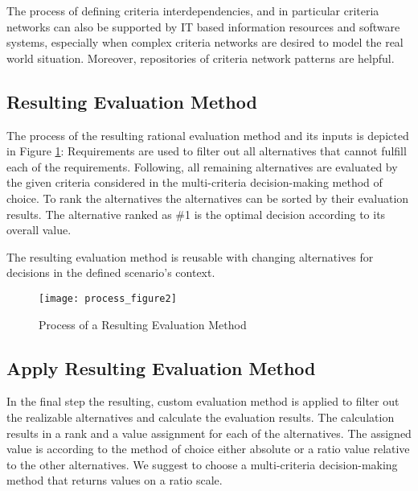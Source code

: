 \documentclass[journal,final,a4paper,twoside]{IEEEtran}
\begin{document}
The process of defining criteria interdependencies, and in particular criteria networks can also be supported by IT based information resources and software systems, especially when complex criteria networks are desired to model the real world situation. Moreover, repositories of criteria network patterns are helpful.

\subsection{Resulting Evaluation Method}
The process of the resulting rational evaluation method and its inputs is depicted in Figure \ref{fig2}: Requirements are used to filter out all alternatives that cannot fulfill each of the requirements. Following, all remaining alternatives are evaluated by the given criteria considered in the multi-criteria decision-making method of choice. To rank the alternatives the alternatives can be sorted by their evaluation results. The alternative ranked as \#1 is the optimal decision according to its overall value. 

The resulting evaluation method is reusable with changing alternatives for decisions in the defined scenario's context.

\begin{figure}[!t]
\centering
\texttt{[image: process\_figure2]}
\caption{Process of a Resulting Evaluation Method }
\label{fig2}
\end{figure}

\subsection{Apply Resulting Evaluation Method}
In the final step the resulting, custom evaluation method is applied to filter out the realizable alternatives and calculate the evaluation results. The calculation results in a rank and a value assignment for each of the alternatives. The assigned value is according to the method of choice either absolute or a ratio value relative to the other alternatives. We suggest to choose a multi-criteria decision-making method that returns values on a ratio scale.
\end{document}
